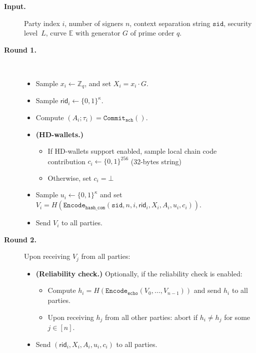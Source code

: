 \documentclass[11pt]{article}
\newcommand{\sid}{\ensuremath{\mathtt{sid}}}
\newcommand{\commit}[1]{\ensuremath{\mathtt{Commit}_{\mathtt{#1}}}}
\newcommand{\Encode}[1]{\ensuremath{\mathtt{Encode}_{\mathtt{#1}}}}
\newcommand{\rid}{\textsf{rid}}
\newcommand{\E}{\mathbb{E}}
\newcommand{\Z}{\mathbb{Z}}
\newcommand{\?}[1]{\stackrel{?}{#1}}
\begin{document}
\begin{description}
\item[\bf Input.]
    Party index $i$,
    number of signers $n$,
    context separation string \sid,
    security level~$L$,
    curve $\E$ with generator $G$ of prime order $q$.

\item[\bf Round 1.] \
\begin{itemize}
    \item Sample $x_i \gets \Z_q$, 
          and set $X_i = x_i \cdot G$.
    \item Sample $\rid_i \gets \{0,1\}^\kappa$.
    \item Compute $(A_i; \tau_i) = \commit{sch}()$.
    \item {\bf (HD-wallets.)} 
    \begin{itemize}
      \item If HD-wallets support enabled, sample local chain code contribution $c_i \gets \{0,1\}^{256}$ (32-bytes string)
      \item Otherwise, set $c_i = \bot$
    \end{itemize}
    \item Sample $u_i \gets \{0,1\}^\kappa$
          and set $V_i = H(\Encode{hash\_com}(\sid, n, i, \rid_i, X_i, A_i, u_i, c_i))$.
    \item Send $V_i$ to all parties.
\end{itemize}

\item[\bf Round 2.] Upon receiving $V_j$ from all parties:
\begin{itemize}
    \item {\bf (Reliability check.)} Optionally, if the reliability check is enabled:
\begin{itemize}
    \item Compute $h_i = H(\Encode{echo}(V_0, \dots, V_{n-1}))$ and
        send $h_i$ to all parties.
    
    \item Upon receiving $h_j$ from all other parties: abort if $h_i \neq h_j$ for some $j\in [n]$.
\end{itemize}
    \item Send $(\rid_i, X_i, A_i, u_i, c_i)$ to all parties.
    \end{itemize}


\end{description}
\end{document}
